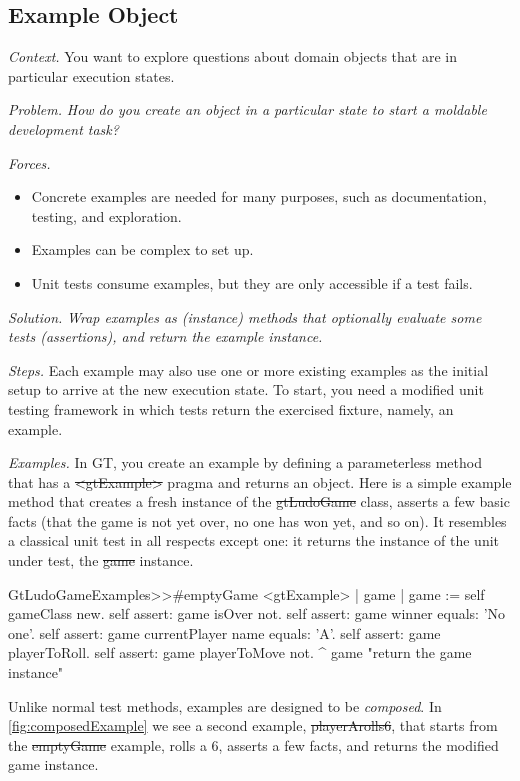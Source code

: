 \documentclass[acmsmall,screen,authorversion,nonacm]{acmart} %
\newcommand\cp[1]{\nbe{Cesare}{#1}{olive}} %
\newcommand\dd[1]{\nbe{Daniel}{#1}{magenta}} %
\newcommand{\pattern}[2]{\needlines{10}
\subsection*{#1}\label{pat:#2}}
\newcommand{\patsec}[1]{\noindent\textit{#1.}\xspace}
\begin{document}
\pattern{Example Object}{ExampleObject}
\patsec{Context}
You want to explore questions about domain objects that are in particular execution states.

\patsec{Problem}
\emph{How do you create an object in a particular state to start a moldable development task?}

\patsec{Forces}
\begin{itemize}[---]
\item Concrete examples are needed for many purposes, such as documentation, testing, and exploration.
\item Examples can be complex to set up.
\item Unit tests consume examples, but they are only accessible if a test fails.
\end{itemize}

\patsec{Solution}
\emph{Wrap examples as (instance) methods that optionally evaluate some tests (assertions), 
and return the example instance.}

\patsec{Steps}
Each example may also use one or more existing examples as the initial setup to arrive at the new execution state.
To start, you need a modified unit testing framework in which tests return the exercised fixture, namely, an example.

\patsec{Examples}
In GT, you create an example by defining a parameterless method that has a \st{<gtExample>} pragma and returns an object.
Here is a simple example method that creates a fresh instance of the \st{gtLudoGame} class, asserts a few basic facts (\ie that the game is not yet over, no one has won yet, and so on).
It resembles a classical unit test in all respects except one: it returns the instance of the unit under test, \ie the \st{game} instance.


\begin{code}
GtLudoGameExamples>>#emptyGame
	<gtExample>
	| game |
	game := self gameClass new.
	self assert: game isOver not.
	self assert: game winner equals: 'No one'.
	self assert: game currentPlayer name equals: 'A'.
	self assert: game playerToRoll.
	self assert: game playerToMove not.
	^ game  "return the game instance"
\end{code}

Unlike normal test methods, examples are designed to be \emph{composed}.
In \autoref{fig:composedExample} we see a second example, \st{playerArolls6}, that starts from the \st{emptyGame} example, rolls a $6$, asserts a few facts, and returns the modified game instance.
\end{document}
